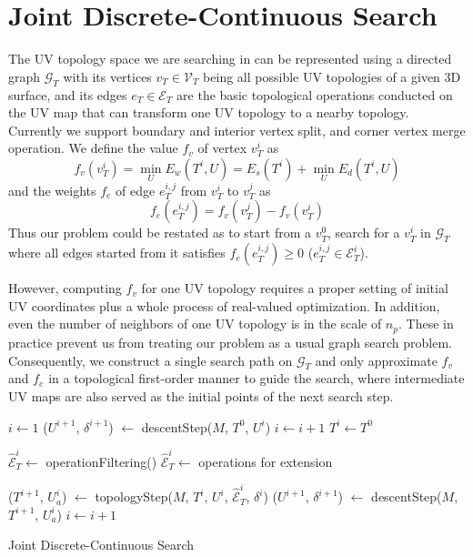 
\section{Joint Discrete-Continuous Search}

The UV topology space we are searching in can be represented using a directed graph $\mathcal{G}_T$ with its vertices $v_T \in \mathcal{V}_T$ being all possible UV topologies of a given 3D surface, and its edges $e_T \in \mathcal{E}_T$ are the basic topological operations conducted on the UV map that can transform one UV topology to a nearby topology. Currently we support boundary and interior vertex split, and corner vertex merge operation.
We define the value $f_v$ of vertex $v^i_T$ as 
\[ f_v(v^i_T) = \min_{U} E_w(T^i, U) = E_s(T^i) + \min_{U} E_d(T^i, U) \]
and the weights $f_e$ of edge $e^{i,j}_{T}$ from $v^i_T$ to $v^j_T$ as 
\[ f_e(e^{i,j}_T) = f_v(v^j_T) - f_v(v^i_T) \]
Thus our problem could be restated as to start from a $v^0_T$, search for a $v^i_T$ in $\mathcal{G}_T$ where all edges started from it satisfies $f_e(e^{i,j}_T) \geq 0$ ($e^{i,j}_T \in \mathcal{E}^i_T$).

However, computing $f_v$ for one UV topology requires a proper setting of initial UV coordinates plus a whole process of real-valued optimization. In addition, even the number of neighbors of one UV topology is in the scale of $n_p$. These in practice prevent us from treating our problem as a usual graph search problem. Consequently, we construct a single search path on $\mathcal{G}_T$ and only approximate $f_v$ and $f_e$ in a topological first-order manner to guide the search, where intermediate UV maps are also served as the initial points of the next search step.

\begin{algorithm}[h]
\SetAlgoLined
{}
$i \leftarrow 1$\;
{
	($U^{i+1}$, $\delta^{i+1}$) $\leftarrow$ descentStep($M$, $T^0$, $U^i$)\;
	$i \leftarrow i+1$\;
}
$T^i \leftarrow T^0$\;
{
	{
		$\hat{\mathcal{E}}^i_T \leftarrow$ operationFiltering()\;
	}
	{
		$\hat{\mathcal{E}}^i_T \leftarrow$ operations for extension\;
	}

	($T^{i+1}$, $U_a^{i}$) $\leftarrow$ topologyStep($M$, $T^i$, $U^i$, $\hat{\mathcal{E}}^i_T$, $\delta^i$)\;
	($U^{i+1}$, $\delta^{i+1}$) $\leftarrow$ descentStep($M$, $T^{i+1}$, $U_a^i$)\;
	$i \leftarrow i+1$\;
}
\caption{Joint Discrete-Continuous Search}
\label{alg:DCSearch}
\end{algorithm}

